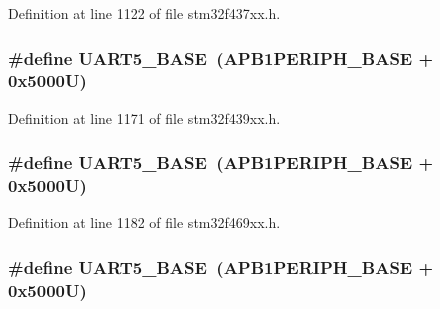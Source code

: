 Definition at line 1122 of file stm32f437xx.\+h.

\subsubsection[{\texorpdfstring{U\+A\+R\+T5\+\_\+\+B\+A\+SE}{UART5_BASE}}]{\setlength{\rightskip}{0pt plus 5cm}\#define U\+A\+R\+T5\+\_\+\+B\+A\+SE~({\bf A\+P\+B1\+P\+E\+R\+I\+P\+H\+\_\+\+B\+A\+SE} + 0x5000\+U)}\hypertarget{group___peripheral__memory__map_gaa155689c0e206e6994951dc3cf31052a}{}\label{group___peripheral__memory__map_gaa155689c0e206e6994951dc3cf31052a}


Definition at line 1171 of file stm32f439xx.\+h.

\subsubsection[{\texorpdfstring{U\+A\+R\+T5\+\_\+\+B\+A\+SE}{UART5_BASE}}]{\setlength{\rightskip}{0pt plus 5cm}\#define U\+A\+R\+T5\+\_\+\+B\+A\+SE~({\bf A\+P\+B1\+P\+E\+R\+I\+P\+H\+\_\+\+B\+A\+SE} + 0x5000\+U)}\hypertarget{group___peripheral__memory__map_gaa155689c0e206e6994951dc3cf31052a}{}\label{group___peripheral__memory__map_gaa155689c0e206e6994951dc3cf31052a}


Definition at line 1182 of file stm32f469xx.\+h.

\subsubsection[{\texorpdfstring{U\+A\+R\+T5\+\_\+\+B\+A\+SE}{UART5_BASE}}]{\setlength{\rightskip}{0pt plus 5cm}\#define U\+A\+R\+T5\+\_\+\+B\+A\+SE~({\bf A\+P\+B1\+P\+E\+R\+I\+P\+H\+\_\+\+B\+A\+SE} + 0x5000\+U)}\hypertarget{group___peripheral__memory__map_gaa155689c0e206e6994951dc3cf31052a}{}\label{group___peripheral__memory__map_gaa155689c0e206e6994951dc3cf31052a}


